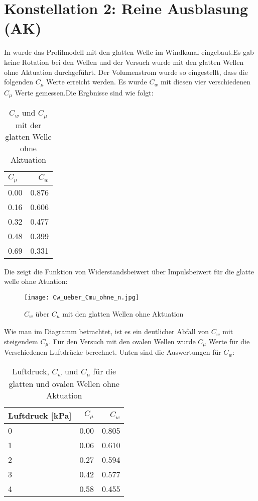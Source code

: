 \section{Konstellation 2: Reine Ausblasung (AK)}
\label{s:reineAusblasung}
In  wurde das Profilmodell mit den glatten Welle im Windkanal eingebaut.Es gab keine Rotation bei den Wellen und der Versuch wurde mit den glatten Wellen ohne Aktuation durchgef\"uhrt. Der Volumenstrom wurde so eingestellt, dass
die folgenden $C_{\mu}$  Werte erreicht werden. Es wurde $C_{w}$ mit diesen vier verschiedenen $C_{\mu}$ Werte gemessen.Die Ergbnisse sind wie folgt:
\begin{table}[H]
	\centering
	\begin{tabular}{lr}
		\toprule
		$C_{\mu}$ & $C_{w}$ \\
		\midrule
		0.00 & 0.876\\
		0.16 & 0.606\\
		0.32 & 0.477\\
		0.48 & 0.399\\
		0.69 & 0.331\\
		\bottomrule
	\end{tabular}
	\caption{$C_{w}$ und $C_{\mu}$ mit der glatten Welle ohne Aktuation }
	\label{tab:Cw-Cmu_Kon1}
\end{table}


Die  zeigt die Funktion von Widerstandsbeiwert \"uber Impulsbeiwert f\"ur die glatte welle ohne Atuation:
\begin{figure}[h]
	\centering
	\texttt{[image: Cw\_ueber\_Cmu\_ohne\_n.jpg]}
	\caption{$C_{w}$  \"uber $C_{\mu}$ mit den glatten Wellen ohne Aktuation }
	\label{fig:Cw-Cmu_Konf1}
\end{figure}

Wie man im Diagramm betrachtet, ist es ein deutlicher Abfall von $C_{w}$ mit steigendem $C_{\mu}$.
F\"ur den Versuch mit den ovalen Wellen wurde $C_{\mu}$ Werte f\"ur die Verschiedenen Luftdr\"ucke berechnet. Unten sind die Auswertungen f\"ur $C_{w}$:
 
\begin{table}[h]
	\centering
	\begin{tabular}{lrr}
		\toprule
		Luftdruck [kPa] & $C_{\mu}$ & $C_{w}$ \\
		\midrule
		0 & 0.00 & 0.805\\
		1 & 0.06 & 0.610\\
		2 & 0.27 & 0.594\\
		3 & 0.42 & 0.577\\
		4 & 0.58 & 0.455\\
		\bottomrule
	\end{tabular}\\
	\caption{Luftdruck, $C_{w}$  und $C_{\mu}$ f\"ur die glatten und ovalen Wellen ohne Aktuation}
	\label{tab:Cw-Cmu_Konf1+2}
\end{table}


